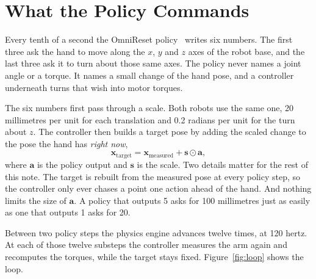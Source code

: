 \section{What the Policy Commands}
\label{sec:command}

Every tenth of a second the OmniReset policy~\cite{omnireset2026} writes six numbers. The first three ask the hand to move along the $x$, $y$ and $z$ axes of the robot base, and the last three ask it to turn about those same axes. The policy never names a joint angle or a torque. It names a small change of the hand pose, and a controller underneath turns that wish into motor torques.

The six numbers first pass through a scale. Both robots use the same one, 20 millimetres per unit for each translation and 0.2 radians per unit for the turn about $z$. The controller then builds a target pose by adding the scaled change to the pose the hand has \emph{right now},
\begin{equation}
\bm{x}_{\text{target}} = \bm{x}_{\text{measured}} + \bm{s} \odot \bm{a},
\end{equation}
where $\bm{a}$ is the policy output and $\bm{s}$ is the scale. Two details matter for the rest of this note. The target is rebuilt from the measured pose at every policy step, so the controller only ever chases a point one action ahead of the hand. And nothing limits the size of $\bm{a}$. A policy that outputs 5 asks for 100 millimetres just as easily as one that outputs 1 asks for 20.

Between two policy steps the physics engine advances twelve times, at 120 hertz. At each of those twelve substeps the controller measures the arm again and recomputes the torques, while the target stays fixed. Figure~\ref{fig:loop} shows the loop.

